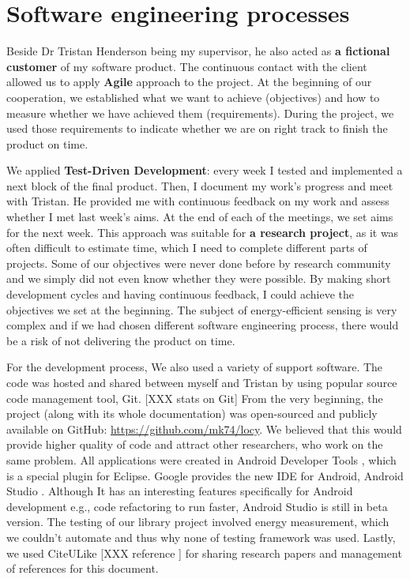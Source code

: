 \section{Software engineering processes}
\label{s:processes}
Beside Dr Tristan Henderson being my supervisor, he also acted as \textbf{a fictional customer} of my software product. The continuous contact with the client allowed us to apply \textbf{Agile} approach to the project. At the beginning of our cooperation,  we established what we want to achieve (objectives) and how to measure whether we have achieved them (requirements). During the project, we used those requirements to indicate whether we are on right track to finish the product on time.

We applied \textbf{Test-Driven Development}: every week I tested and implemented a next block of the final product. Then, I document my work's progress and meet with Tristan. He provided me with continuous feedback on my work and assess whether I met last week's aims. At the end of each of the meetings, we set aims for the next week. This approach was suitable for \textbf{a research project}, as it was often difficult to estimate time, which I need to complete different parts of projects. Some of our objectives were never done before by research community and we simply did not even know whether they were possible. By making short development cycles and having continuous feedback, I could achieve the objectives we set at the beginning. The subject of energy-efficient sensing is very complex and if we had chosen different software engineering process, there would be a risk of not delivering the product on time. 
			
For the development process, We also used a variety of support software. The code was hosted and shared between myself and Tristan by using popular source code management tool, Git. [XXX stats on Git] From the very beginning, the project (along with its whole documentation) was open-sourced and publicly available on GitHub: \url{https://github.com/mk74/locy}. We believed that this would provide higher quality of code and attract other researchers, who work on the same problem. All applications were created in Android Developer Tools \cite{google:adt}, which is a special plugin for Eclipse. Google provides the new IDE for Android, Android Studio \cite{google:androidstudio}. Although It has an interesting features specifically for Android development e.g., code refactoring to run faster, Android Studio is still in beta version. The testing of our library project involved energy measurement, which we couldn't automate and thus why none of testing framework was used. Lastly, we used CiteULike [XXX reference ] for sharing research papers and management of references for this document.
	